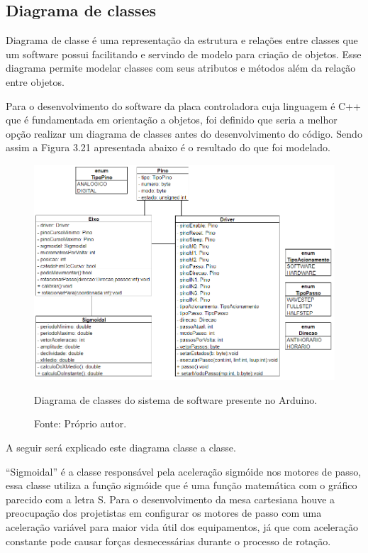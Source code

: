 \subsection{Diagrama de classes}

Diagrama de classe é uma representação da estrutura e relações entre classes que um software possui 
facilitando e servindo de modelo para criação de objetos. Esse diagrama permite modelar classes com seus 
atributos e métodos além da relação entre objetos.

Para o desenvolvimento do software da placa controladora cuja linguagem é C++ que é fundamentada em 
orientação a objetos, foi definido que seria a melhor opção realizar um diagrama de classes antes do 
desenvolvimento do código. Sendo assim a Figura 3.21 apresentada abaixo é o resultado do que foi modelado.

\begin{figure}[!htb]
\centering
\includegraphics[scale = 0.5]{figuras/3-21}
\caption{Diagrama de classes do sistema de software presente no Arduino.}
\caption*{Fonte: Próprio autor.}
\label{figdiagramaclasses}
\end{figure}
    
A seguir será explicado este diagrama classe a classe.

“Sigmoidal” é a classe responsável pela aceleração sigmóide nos motores de passo, essa classe utiliza 
a função sigmóide que é uma função matemática com o gráfico parecido com a letra S. Para o desenvolvimento 
da mesa cartesiana houve a preocupação dos projetistas em configurar os motores de passo com uma aceleração 
variável para maior vida útil dos equipamentos, já que com aceleração constante pode causar forças 
desnecessárias durante o processo de rotação.

